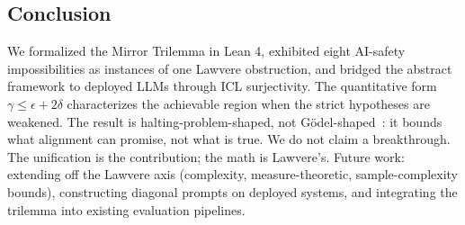 \subsection{Conclusion}
\label{sec:conclusion}

We formalized the Mirror Trilemma in Lean 4, exhibited eight AI-safety impossibilities as instances of one Lawvere obstruction, and bridged the abstract framework to deployed LLMs through ICL surjectivity. The quantitative form $\gamma \le \epsilon + 2\delta$ characterizes the achievable region when the strict hypotheses are weakened. The result is halting-problem-shaped, not G\"odel-shaped~\citep{turing1936, rice1953, goedel1931}: it bounds what alignment can promise, not what is true. We do not claim a breakthrough. The unification is the contribution; the math is Lawvere's. Future work: extending off the Lawvere axis (complexity, measure-theoretic, sample-complexity bounds), constructing diagonal prompts on deployed systems, and integrating the trilemma into existing evaluation pipelines.
